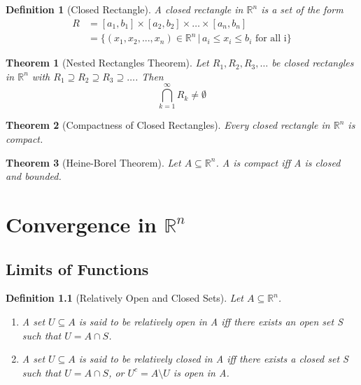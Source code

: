 \documentclass[11pt, oneside]{book}
\theoremstyle{break}
\newtheorem{thm}{Theorem}[section]
\newtheorem{defn}{Definition}[section]
\newcommand{\bb}[1]{\mathbb{#1}}		%
\begin{document}
\begin{defn}[Closed Rectangle]
	A closed rectangle in $\bb{R}^n$ is a set of the form
	\begin{align*}
		R &= [a_1, b_1] \times [a_2, b_2] \times \hdots \times [a_n, b_n] \\
		  &= \{(x_1, x_2, ..., x_n) \in \bb{R}^n \, | \, a_i \leq x_i \leq b_i \text{ for all i}\}
	\end{align*}
\end{defn}

\begin{thm}[Nested Rectangles Theorem]
	Let $R_1, R_2, R_3, \hdots$ be closed rectangles in $\bb{R}^n$ with $R_1 \supseteq R_2 \supseteq R_3 \supseteq \hdots $. Then
	\begin{equation*}
		\bigcap_{k=1}^\infty R_k \neq \emptyset
	\end{equation*}
\end{thm}

\begin{thm}[Compactness of Closed Rectangles]
	Every closed rectangle in $\bb{R}^n$ is compact.
\end{thm}

\begin{thm}[Heine-Borel Theorem]
	Let $A \subseteq \bb{R}^n$. A is compact iff A is closed and bounded.
\end{thm}


\chapter{Convergence in \texorpdfstring{$\bb{R}^n$}{Rn}}


\section{Limits of Functions}

\begin{defn}[Relatively Open and Closed Sets]
	Let $A \subseteq \bb{R}^n$.
	\begin{enumerate}
		\item A set $U \subseteq A$ is said to be relatively open in A iff there exists an open set S such that $U = A \cap S$.
		\item A set $U \subseteq A$ is said to be relatively closed in A iff there exists a closed set S such that $U = A \cap S$, or $U^c = A \setminus U$ is open in A.
	\end{enumerate}
\end{defn}
\end{document}
